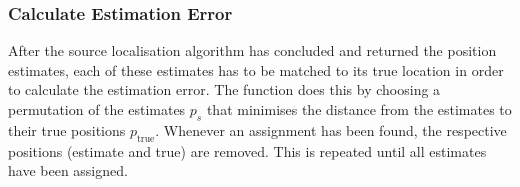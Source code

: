 \subsubsection{Calculate Estimation Error}
After the source localisation algorithm has concluded and returned the position estimates, each of these estimates has to be matched to its true location in order to calculate the estimation error. The function  does this by choosing a permutation of the estimates $p_s$ that minimises the distance from the estimates to their true positions $p_{\text{true}}$. Whenever an assignment has been found, the respective positions (estimate and true) are removed. This is repeated until all estimates have been assigned.
